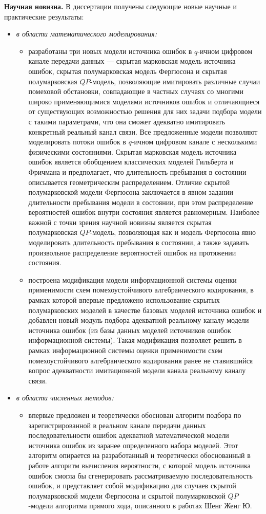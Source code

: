 \documentclass[twoside,12pt]{article}
\begin{document}
\textbf{Научная новизна.} В диссертации получены следующие новые научные и практические результаты:
\begin{itemize}
  \item {\textit{в области математического моделирования:}
\begin{itemize}
  \item {разработаны три новых модели источника ошибок в $q$-ичном цифровом канале передачи данных --- скрытая марковская модель источника ошибок, скрытая полумарковская модель Фергюсона и скрытая полумарковская $QP$-модель, позволяющие имитировать различные случаи помеховой обстановки, совпадающие в частных случаях со многими широко применяющимися моделями источников ошибок и отличающиеся от существующих возможностью решения для них задачи подбора модели с такими параметрами, что она сможет адекватно имитировать конкретный реальный канал связи. Все предложенные модели позволяют моделировать потоки ошибок в $q$-ичном цифровом канале с несколькими физическими состояниями. Скрытая марковская модель источника ошибок является обобщением классических моделей Гильберта и Фричмана и предполагает, что длительность пребывания в состоянии описывается геометрическим распределением. Отличие скрытой полумарковской модели Фергюсона заключается в явном задании длительности пребывания модели в состоянии, при этом распределение вероятностей ошибок внутри состояния является равномерным. Наиболее важной с точки зрения научной новизны является скрытая полумарковская $QP$-модель, позволяющая как и модель Фергюсона явно моделировать длительность пребывания в состоянии, а также задавать произвольное распределение вероятностей ошибок на протяжении состояния.}
  \item {построена модификация модели информационной системы оценки применимости схем помехоустойчивого алгебраического кодирования, в рамках которой впервые предложено использование скрытых полумарковских моделей в качестве базовых моделей источника ошибок и добавлен новый модуль подбора адекватной реальному каналу модели источника ошибок (из базы данных моделей источников ошибок информационной системы). Такая модификация позволяет решить в рамках информационной системы оценки применимости схем помехоустойчивого алгебраического кодирования ранее не ставившийся вопрос адекватности имитационной модели канала реальному каналу связи}.
\end{itemize}
  }
  \item {\textit{в области численных методов:}
  \begin{itemize}
  \item {впервые предложен и теоретически обоснован алгоритм подбора по зарегистрированной в реальном канале передачи данных последовательности ошибок адекватной математической модели источника ошибок из заранее определенного набора моделей. Этот алгоритм опирается на разработанный и теоретически обоснованный в работе алгоритм вычисления вероятности, с которой модель источника ошибок смогла бы сгенерировать рассматриваемую последовательность ошибок, и представляет собой модификацию для случаев скрытой полумарковской модели Фергюсона и скрытой полумарковской $QP$-модели алгоритма прямого хода, описанного в работах Шенг Женг Ю.}

\end{itemize}}
\end{itemize}
\end{document}
